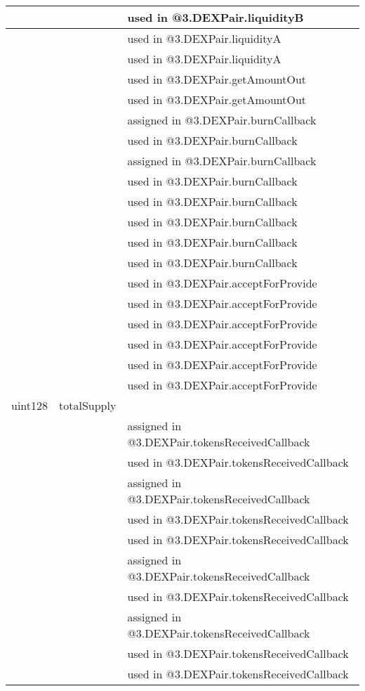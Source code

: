 \begin{tabular}{|l|l|p{5cm}|}
 & & used in @3.DEXPair.liquidityB\\\hline
 & & used in @3.DEXPair.liquidityA\\\hline
 & & used in @3.DEXPair.liquidityA\\\hline
 & & used in @3.DEXPair.getAmountOut\\\hline
 & & used in @3.DEXPair.getAmountOut\\\hline
 & & assigned in @3.DEXPair.burnCallback\\\hline
 & & used in @3.DEXPair.burnCallback\\\hline
 & & assigned in @3.DEXPair.burnCallback\\\hline
 & & used in @3.DEXPair.burnCallback\\\hline
 & & used in @3.DEXPair.burnCallback\\\hline
 & & used in @3.DEXPair.burnCallback\\\hline
 & & used in @3.DEXPair.burnCallback\\\hline
 & & used in @3.DEXPair.burnCallback\\\hline
 & & used in @3.DEXPair.acceptForProvide\\\hline
 & & used in @3.DEXPair.acceptForProvide\\\hline
 & & used in @3.DEXPair.acceptForProvide\\\hline
 & & used in @3.DEXPair.acceptForProvide\\\hline
 & & used in @3.DEXPair.acceptForProvide\\\hline
 & & used in @3.DEXPair.acceptForProvide\\\hline
uint128 & totalSupply &  \\\hline
 & & assigned in @3.DEXPair.tokensReceivedCallback\\\hline
 & & used in @3.DEXPair.tokensReceivedCallback\\\hline
 & & assigned in @3.DEXPair.tokensReceivedCallback\\\hline
 & & used in @3.DEXPair.tokensReceivedCallback\\\hline
 & & used in @3.DEXPair.tokensReceivedCallback\\\hline
 & & assigned in @3.DEXPair.tokensReceivedCallback\\\hline
 & & used in @3.DEXPair.tokensReceivedCallback\\\hline
 & & assigned in @3.DEXPair.tokensReceivedCallback\\\hline
 & & used in @3.DEXPair.tokensReceivedCallback\\\hline
 & & used in @3.DEXPair.tokensReceivedCallback\\\hline

\end{tabular}
